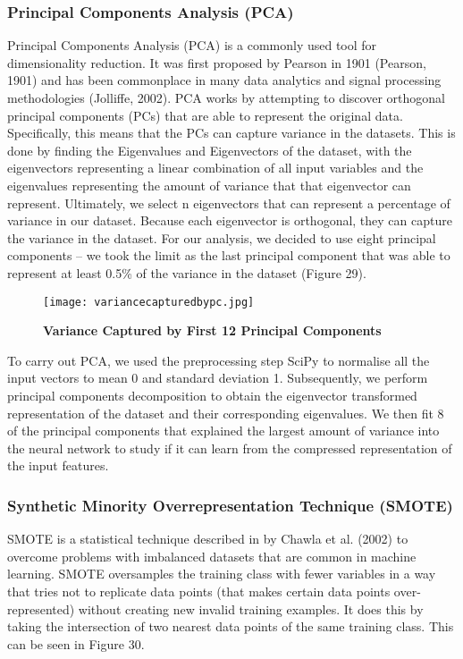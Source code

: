 \documentclass{article}
\begin{document}
\subsubsection{Principal Components Analysis (PCA)}
Principal Components Analysis (PCA) is a commonly used tool for dimensionality reduction. It was first proposed by Pearson in 1901 (Pearson, 1901) and has been commonplace in many data analytics and signal processing methodologies (Jolliffe, 2002). PCA works by attempting to discover orthogonal principal components (PCs) that are able to represent the original data. Specifically, this means that the PCs can capture variance in the datasets. This is done by finding the Eigenvalues and Eigenvectors of the dataset, with the eigenvectors representing a linear combination of all input variables and the eigenvalues representing the amount of variance that that eigenvector can represent. Ultimately, we select n eigenvectors that can represent a percentage of variance in our dataset. Because each eigenvector is orthogonal, they can capture the variance in the dataset. For our analysis, we decided to use eight principal components -- we took the limit as the last principal component that was able to represent at least 0.5\% of the variance in the dataset (Figure 29).
 
\begin{figure}[H]
\texttt{[image: variancecapturedbypc.jpg]}
\caption{\textbf{Variance Captured by First 12 Principal Components}}
\centering
\end{figure}

To carry out PCA, we used the preprocessing step SciPy to normalise all the input vectors to mean 0 and standard deviation 1. Subsequently, we perform principal components decomposition to obtain the eigenvector transformed representation of the dataset and their corresponding eigenvalues. We then fit 8 of the principal components that explained the largest amount of variance into the neural network to study if it can learn from the compressed representation of the input features. 
\subsubsection{Synthetic Minority Overrepresentation Technique (SMOTE)}
SMOTE is a statistical technique described in by Chawla et al. (2002) to overcome problems with imbalanced datasets that are common in machine learning. SMOTE oversamples the training class with fewer variables in a way that tries not to replicate data points (that makes certain data points over-represented) without creating new invalid training examples. It does this by taking the intersection of two nearest data points of the same training class. This can be seen in Figure 30. 
\end{document}
